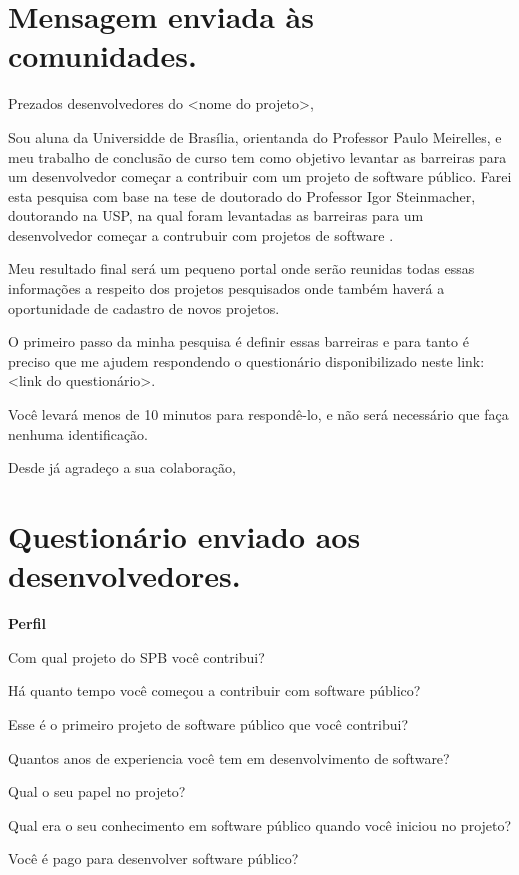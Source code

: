 \begin{anexosenv}

\partanexos

\chapter{Mensagem enviada às comunidades.}
\label{anexo a}

Prezados desenvolvedores do <nome do projeto>,

Sou aluna da Universidde de Brasília, orientanda do Professor
Paulo Meirelles, e meu trabalho de conclusão de curso tem como 
objetivo levantar as barreiras para um desenvolvedor 
começar a contribuir com um projeto de software público. Farei esta pesquisa 
com base na tese de doutorado do Professor Igor Steinmacher, doutorando na USP,
na qual foram levantadas as barreiras para um desenvolvedor começar a contrubuir 
com projetos de software .

Meu resultado final será um pequeno portal onde serão reunidas todas essas informações
a respeito dos projetos pesquisados onde também haverá a oportunidade de cadastro de
novos projetos.

O primeiro passo da minha pesquisa é definir essas barreiras e para tanto é
preciso que me ajudem respondendo o questionário disponibilizado neste link:
<link do questionário>.

Você levará menos de 10 minutos para respondê-lo, e não será necessário que faça
nenhuma identificação.

Desde já agradeço a sua colaboração,

\chapter{Questionário enviado aos desenvolvedores.}
\label{anexo b}

\textbf{Perfil}

Com qual projeto do SPB você contribui?

Há quanto tempo você começou a contribuir com software público?

Esse é o primeiro projeto de software público que você contribui?

Quantos anos de experiencia você tem em desenvolvimento de software?

Qual o seu papel no projeto?

Qual era o seu conhecimento em software público quando você iniciou no projeto?

Você é pago para desenvolver software público?


\end{anexosenv}
